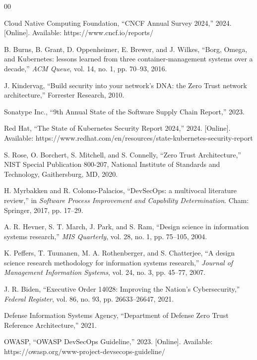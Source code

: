 \documentclass[conference]{IEEEtran}
\begin{document}
\begin{thebibliography}{00}

 Cloud Native Computing Foundation, ``CNCF Annual Survey 2024,'' 2024. [Online]. Available: https://www.cncf.io/reports/

 B. Burns, B. Grant, D. Oppenheimer, E. Brewer, and J. Wilkes, ``Borg, Omega, and Kubernetes: lessons learned from three container-management systems over a decade,'' \emph{ACM Queue}, vol. 14, no. 1, pp. 70--93, 2016.

 J. Kindervag, ``Build security into your network's DNA: the Zero Trust network architecture,'' Forrester Research, 2010.

 Sonatype Inc., ``9th Annual State of the Software Supply Chain Report,'' 2023.

 Red Hat, ``The State of Kubernetes Security Report 2024,'' 2024. [Online]. Available: https://www.redhat.com/en/resources/state-kubernetes-security-report

 S. Rose, O. Borchert, S. Mitchell, and S. Connelly, ``Zero Trust Architecture,'' NIST Special Publication 800-207, National Institute of Standards and Technology, Gaithersburg, MD, 2020.

 H. Myrbakken and R. Colomo-Palacios, ``DevSecOps: a multivocal literature review,'' in \emph{Software Process Improvement and Capability Determination}. Cham: Springer, 2017, pp. 17--29.

 A. R. Hevner, S. T. March, J. Park, and S. Ram, ``Design science in information systems research,'' \emph{MIS Quarterly}, vol. 28, no. 1, pp. 75--105, 2004.

 K. Peffers, T. Tuunanen, M. A. Rothenberger, and S. Chatterjee, ``A design science research methodology for information systems research,'' \emph{Journal of Management Information Systems}, vol. 24, no. 3, pp. 45--77, 2007.

 J. R. Biden, ``Executive Order 14028: Improving the Nation's Cybersecurity,'' \emph{Federal Register}, vol. 86, no. 93, pp. 26633--26647, 2021.

 Defense Information Systems Agency, ``Department of Defense Zero Trust Reference Architecture,'' 2021.

 OWASP, ``OWASP DevSecOps Guideline,'' 2023. [Online]. Available: https://owasp.org/www-project-devsecops-guideline/


\end{thebibliography}
\end{document}
